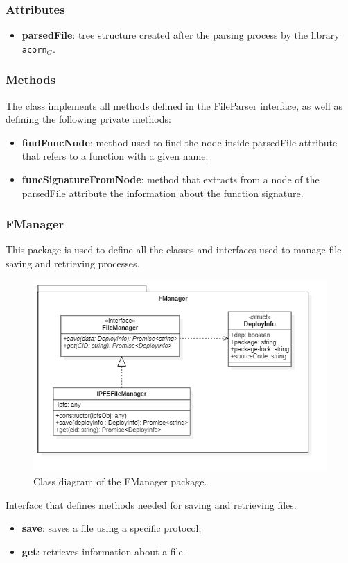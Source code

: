 				\subsubsection*{Attributes}
					\begin{itemize}
						\item \textbf{parsedFile}: tree structure created after the parsing process by the library \texttt{acorn}$_{G}$.
					\end{itemize}
				
				\subsubsection*{Methods}
				The class implements all methods defined in the FileParser interface, as well as defining the following private methods: 
				\begin{itemize}
					\item \textbf{findFuncNode}: method used to find the node inside parsedFile attribute that refers to a function with a given name; 
					\item \textbf{funcSignatureFromNode}: method that extracts from a node of the parsedFile attribute the information about the function signature. 
				\end{itemize}
			
		\subsubsection{FManager} 			
		This package is used to define all the classes and interfaces used to manage file saving and retrieving processes.
		\begin{figure} [h!]
			\centering
			\includegraphics[width=0.5\linewidth]{diagrammi/etherless-cli/FManager}
			\caption{Class diagram of the FManager package.}
		\end{figure}	
				
			Interface that defines methods needed for saving and retrieving files. 
		
					\begin{itemize}
						\item \textbf{save}: saves a file using a specific protocol;
						\item \textbf{get}: retrieves information about a file.
				\end{itemize}
			
